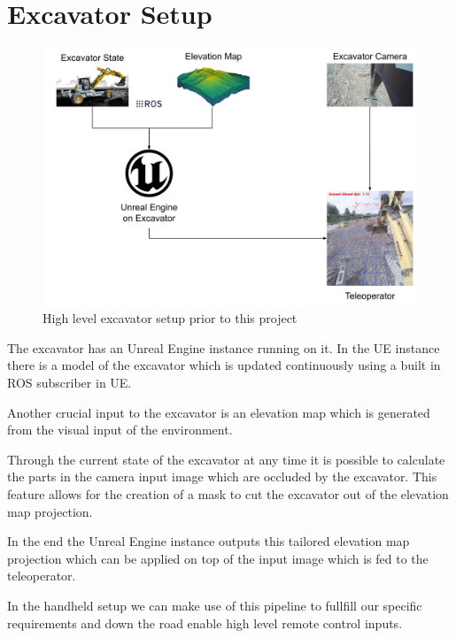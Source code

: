 \chapter{Excavator Setup}\label{ch:excavatorSetup}

\begin{figure}[ht]
    \centering
    \includegraphics[scale = 0.3]{images/excavator/excavator_setup.png}
    \caption{High level excavator setup prior to this project}
    \label{fig:ex_setup}
\end{figure}

The excavator has an Unreal Engine instance running on it. In the UE instance there is a model of the excavator which is updated continuously using a built in ROS subscriber in UE. 

Another crucial input to the excavator is an elevation map which is generated from the visual input of the environment.

Through the current state of the excavator at any time it is possible to calculate the parts in the camera input image which are occluded by the excavator. This feature allows for the creation of a mask to cut the excavator out of the elevation map projection.

In the end the Unreal Engine instance outputs this tailored elevation map projection which can be applied on top of the input image which is fed to the teleoperator.

In the handheld setup we can make use of this pipeline to fullfill our specific requirements and down the road enable high level remote control inputs.
